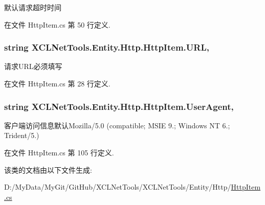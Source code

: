 默认请求超时时间 



在文件 Http\-Item.\-cs 第 50 行定义.

\hypertarget{class_x_c_l_net_tools_1_1_entity_1_1_http_1_1_http_item_aaaa3a229c51a9c1dab14f61c0104b380}{
\subsubsection[{U\-R\-L}]{\setlength{\rightskip}{0pt plus 5cm}string X\-C\-L\-Net\-Tools.\-Entity.\-Http.\-Http\-Item.\-U\-R\-L\hspace{0.3cm}{\ttfamily [get]}, {\ttfamily [set]}}}\label{class_x_c_l_net_tools_1_1_entity_1_1_http_1_1_http_item_aaaa3a229c51a9c1dab14f61c0104b380}


请求\-U\-R\-L必须填写 



在文件 Http\-Item.\-cs 第 28 行定义.

\hypertarget{class_x_c_l_net_tools_1_1_entity_1_1_http_1_1_http_item_af781edd22001f482ae8090b6cbee1cdb}{
\subsubsection[{User\-Agent}]{\setlength{\rightskip}{0pt plus 5cm}string X\-C\-L\-Net\-Tools.\-Entity.\-Http.\-Http\-Item.\-User\-Agent\hspace{0.3cm}{\ttfamily [get]}, {\ttfamily [set]}}}\label{class_x_c_l_net_tools_1_1_entity_1_1_http_1_1_http_item_af781edd22001f482ae8090b6cbee1cdb}


客户端访问信息默认\-Mozilla/5.0 (compatible; M\-S\-I\-E 9.; Windows N\-T 6.; Trident/5.) 



在文件 Http\-Item.\-cs 第 105 行定义.



该类的文档由以下文件生成\-:\begin{DoxyCompactItemize}
\item 
D\-:/\-My\-Data/\-My\-Git/\-Git\-Hub/\-X\-C\-L\-Net\-Tools/\-X\-C\-L\-Net\-Tools/\-Entity/\-Http/\hyperlink{_http_item_8cs}{Http\-Item.\-cs}\end{DoxyCompactItemize}
